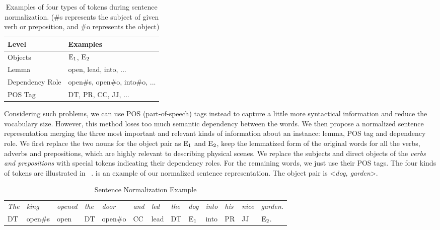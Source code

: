 \begin{table}[th]
	\centering
	\small
	\begin{tabular}{l|l}
		\hline
		\textbf{Level}	&  \textbf{Examples}\\ 		\hline
		Objects	& $\textnormal{E}_1$, $\textnormal{E}_2$ \\ 		\hline
		Lemma & open, lead, into, ...\\ \hline 
		Dependency Role	& open\#s, open\#o, into\#o, ... \\ 		\hline 
		POS Tag	& DT, PR, CC, JJ, ... \\ 		\hline 
	\end{tabular}
	\caption{Examples of four types of tokens during sentence normalization. (\#s represents the subject of given verb or preposition, and \#o represents the object)}
	\label{tab:norm}
\end{table}

Considering such problems, we can use POS (part-of-speech) tags instead to capture a little more syntactical information and reduce the vocabulary size. 
However, this method loses too much semantic dependency between the words. 
We then propose a normalized sentence representation merging the three most important and relevant kinds of information about an instance: lemma, POS tag and dependency role. 
We first replace the two nouns for the object pair as $\textnormal{E}_1$ and $\textnormal{E}_2$, keep the lemmatized form of the original words for all the verbs, adverbs and prepositions, which are highly relevant to describing physical scenes. 
We replace the subjects and direct objects of the \textit{verbs and prepositions} with special tokens indicating their dependency roles. 
For the remaining words, we just use their POS tags. 
The four kinds of tokens are illustrated in ~.
 is an example of our normalized sentence representation. The object pair is \textless \textit{dog, garden}\textgreater.

\begin{table*}[!th]
\centering
\begin{tabular}{lllllllllllll}
		\hline
\textit{The }&\textit{king }&\textit{opened }&\textit{the}&\textit{door}&\textit{and}& \textit{led}& \textit{the}& \textit{dog }& \textit{into }& \textit{his }& \textit{nice }& \textit{garden.}\\		 
DT & open\#s & open & DT & open\#o & CC& lead& DT &$\textnormal{E}_1$ & into & PR & JJ& $\textnormal{E}_2$.\\	 \hline
\end{tabular}
\caption{Sentence Normalization Example}
\label{tab:norm_eg}
\end{table*}

